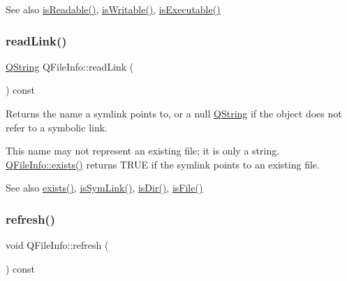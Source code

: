 \begin{DoxySeeAlso}{See also}
\mbox{\hyperlink{class_q_file_info_af8795a46c49f6911a14f66218949f213}{is\+Readable()}}, \mbox{\hyperlink{class_q_file_info_ab2dcfc1ea9764ea5e6ea9cc684156c92}{is\+Writable()}}, \mbox{\hyperlink{class_q_file_info_a5b834ba486c5f6da3b429751ee84fd12}{is\+Executable()}} 
\end{DoxySeeAlso}
\mbox{\label{class_q_file_info_ad6d74b51c535f45dda430ac0d755f569}} 
\subsubsection{\texorpdfstring{readLink()}{readLink()}}
{\footnotesize\ttfamily \mbox{\hyperlink{class_q_string}{Q\+String}} Q\+File\+Info\+::read\+Link (\begin{DoxyParamCaption}{ }\end{DoxyParamCaption}) const}

Returns the name a symlink points to, or a null \mbox{\hyperlink{class_q_string}{Q\+String}} if the object does not refer to a symbolic link.

This name may not represent an existing file; it is only a string. \mbox{\hyperlink{class_q_file_info_af7a247c24ea455875293d6406db652a4}{Q\+File\+Info\+::exists()}} returns T\+R\+UE if the symlink points to an existing file.

\begin{DoxySeeAlso}{See also}
\mbox{\hyperlink{class_q_file_info_af7a247c24ea455875293d6406db652a4}{exists()}}, \mbox{\hyperlink{class_q_file_info_a0e8114893edbe9d471b6f1389add29fd}{is\+Sym\+Link()}}, \mbox{\hyperlink{class_q_file_info_a91a725dd517a4b77b15077e72a7a1501}{is\+Dir()}}, \mbox{\hyperlink{class_q_file_info_a6bc9021370d012084b9464ba22172d46}{is\+File()}} 
\end{DoxySeeAlso}
\mbox{\label{class_q_file_info_a2e046cd4da1f8804c9f39e05921232c5}} 
\subsubsection{\texorpdfstring{refresh()}{refresh()}}
{\footnotesize\ttfamily void Q\+File\+Info\+::refresh (\begin{DoxyParamCaption}{ }\end{DoxyParamCaption}) const}

